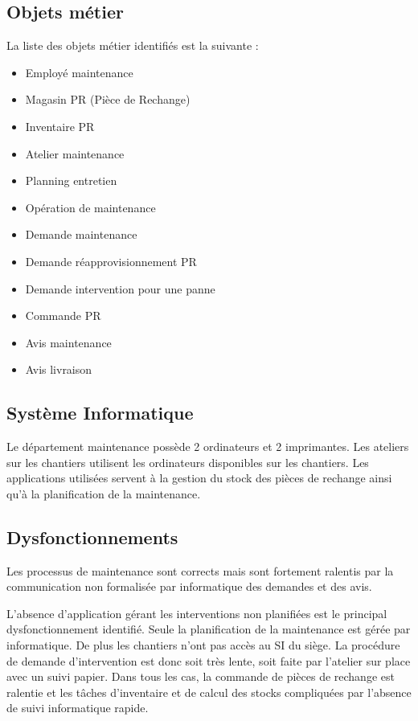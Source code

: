 \documentclass[12pt]{article}
\begin{document}
\subsection{Objets métier}
La liste des objets métier identifiés est la suivante :
\begin{itemize}
\item Employé maintenance
\item Magasin PR (Pièce de Rechange)
\item Inventaire PR
\item Atelier maintenance
\item Planning entretien
\item Opération de maintenance
\item Demande maintenance
\item Demande réapprovisionnement PR
\item Demande intervention pour une panne
\item Commande PR
\item Avis maintenance
\item Avis livraison
\end{itemize}

\subsection{Système Informatique}
Le département maintenance possède 2 ordinateurs et 2 imprimantes.
Les ateliers sur les chantiers utilisent les ordinateurs disponibles sur les
chantiers.
Les applications utilisées servent à la gestion du stock des pièces de rechange
ainsi qu'à la planification de la maintenance.

\subsection{Dysfonctionnements}
Les processus de maintenance sont corrects mais sont fortement ralentis par
la communication non formalisée par informatique des demandes et des avis.

L'absence d'application gérant les interventions non planifiées est le principal
dysfonctionnement identifié. Seule la planification de la maintenance est gérée
par informatique. De plus les chantiers n'ont pas accès au SI du siège. La 
procédure de demande d'intervention est donc soit très lente, soit faite par
l'atelier sur place avec un suivi papier. Dans tous les cas, la commande de 
pièces de rechange est ralentie et les tâches d'inventaire et de calcul des
stocks compliquées par l'absence de suivi informatique rapide.
\end{document}
